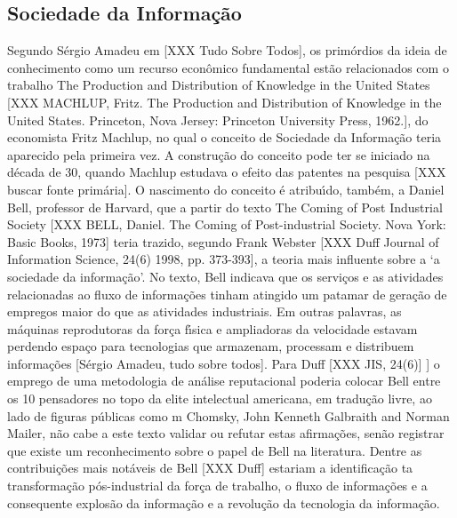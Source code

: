 \documentclass[
12pt,		%
openright,	%
twoside,  %
a4paper,			%
chapter=TITLE,		%
english,			%
french,				%
spanish,			%
brazil				%
]{USPSC-classe/USPSC}
\begin{document}
\subsection[Sociedade da Informa\c{c}\~ao]{Sociedade da Informa\c{c}\~ao}\label{Sociedade da Informa\c{c}\~ao}
Segundo S\'ergio Amadeu em [XXX Tudo Sobre Todos], os prim\'ordios da ideia de conhecimento como um recurso econ\^omico fundamental est\~ao relacionados com o trabalho \textquotedbl The Production and Distribution of Knowledge in the United States [XXX MACHLUP, Fritz. The Production and Distribution of Knowledge in the United States. Princeton, Nova Jersey: Princeton University Press, 1962.], do economista Fritz Machlup, no qual o conceito de Sociedade da Informa\c{c}\~ao teria aparecido pela primeira vez. A constru\c{c}\~ao do conceito pode ter se iniciado na d\'ecada de 30, quando Machlup estudava o efeito das patentes na pesquisa [XXX buscar fonte prim\'aria]. O nascimento do conceito \'e atribu\'{\i}do, tamb\'em, a Daniel Bell, professor de Harvard, que a partir do texto \textquotedbl The Coming of Post Industrial Society [XXX BELL, Daniel. The Coming of Post-industrial Society. Nova York: Basic Books, 1973] teria trazido, segundo Frank Webster [XXX Duff Journal of Information Science, 24(6) 1998, pp. 373-393], \textquotedbl a teoria mais influente sobre a ‘a sociedade da informa\c{c}\~ao’. No texto, Bell indicava que os servi\c{c}os e as atividades relacionadas ao fluxo de informa\c{c}\~oes tinham atingido um patamar de gera\c{c}\~ao de empregos maior do que as atividades industriais. Em outras palavras, \textquotedbl as m\'aquinas reprodutoras da for\c{c}a f\'{\i}sica e ampliadoras da velocidade estavam perdendo espa\c{c}o para tecnologias que armazenam, processam e distribuem informa\c{c}\~oes [S\'ergio Amadeu, tudo sobre todos]. Para Duff [XXX JIS, 24(6)] ] o emprego de uma metodologia de an\'alise \textquotedbl reputacional poderia colocar Bell entre os 10 pensadores no topo da elite intelectual americana, em tradu\c{c}\~ao livre, \textquotedbl ao lado de figuras p\'ublicas como m Chomsky, John Kenneth Galbraith and Norman Mailer, n\~ao cabe a este texto validar ou refutar estas afirma\c{c}\~oes, sen\~ao registrar que existe um reconhecimento sobre o papel de Bell na literatura. Dentre as contribui\c{c}\~oes mais not\'aveis de Bell [XXX Duff] estariam a identifica\c{c}\~ao ta transforma\c{c}\~ao p\'os-industrial da for\c{c}a de trabalho, o fluxo de informa\c{c}\~oes e a consequente \textquotedbl explos\~ao da informa\c{c}\~ao e a \textquotedbl revolu\c{c}\~ao da tecnologia da informa\c{c}\~ao. 
\end{document}
